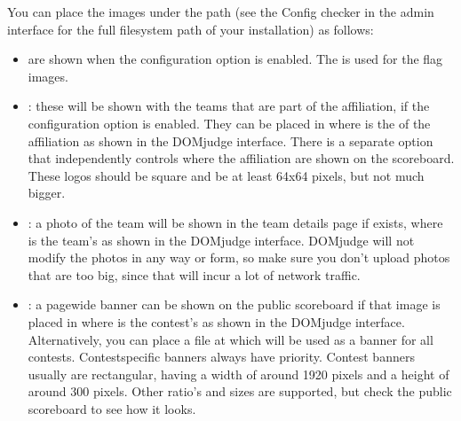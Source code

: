\documentclass[a4paper,10pt,english,openany]{sphinxmanual}
\begin{document}
\sphinxAtStartPar
You can place the images under the path  (see
the Config checker in the admin interface for the full filesystem
path of your installation) as follows:
\begin{itemize}
\item {} 
\sphinxAtStartPar
{} are shown when the  configuration option
is enabled. The 
is used for the flag images.

\item {} 
\sphinxAtStartPar
{}: these will be shown with the teams that are
part of the affiliation, if the  configuration
option is enabled. They can be placed in
 where  is the {\hyperref[\detokenize{import:external-ids}]{}}
of the affiliation as shown in the DOMjudge interface. There is a
separate option  that independently controls where
the affiliation  are shown on the scoreboard. These logos should be
square and be at least 64x64 pixels, but not much bigger.

\item {} 
\sphinxAtStartPar
{}: a photo of the team will be shown in the team details
page if  exists, where  is the
team’s {\hyperref[\detokenize{import:external-ids}]{}} as shown in the DOMjudge interface. DOMjudge will not
modify the photos in any way or form, so make sure you don’t upload photos
that are too big, since that will incur a lot of network traffic.

\item {} 
\sphinxAtStartPar
{}: a page\sphinxhyphen{}wide banner can be shown on the public scoreboard
if that image is placed in  where  is the
contest’s {\hyperref[\detokenize{import:external-ids}]{}} as shown in the DOMjudge interface. Alternatively, you
can place a file at  which will be used as a banner
for all contests. Contest\sphinxhyphen{}specific banners always have priority. Contest
banners usually are rectangular, having a width of around 1920 pixels and a
height of around 300 pixels. Other ratio’s and sizes are supported, but check
the public scoreboard to see how it looks.

\end{itemize}
\end{document}
